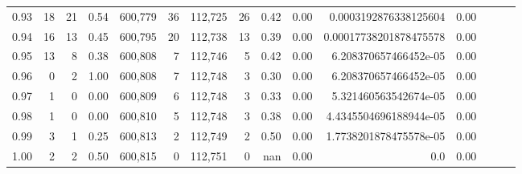 \begin{tabular}{rrrrrrrrrrrrrrr}
0.93 &      18 &     21 &  0.54 &  600,779 &       36 &  112,725 &       26 &  0.42 &  0.00 &   0.0003192876338125604 &      0.00 \\
0.94 &      16 &     13 &  0.45 &  600,795 &       20 &  112,738 &       13 &  0.39 &  0.00 &  0.00017738201878475578 &      0.00 \\
0.95 &      13 &      8 &  0.38 &  600,808 &        7 &  112,746 &        5 &  0.42 &  0.00 &   6.208370657466452e-05 &      0.00 \\
0.96 &       0 &      2 &  1.00 &  600,808 &        7 &  112,748 &        3 &  0.30 &  0.00 &   6.208370657466452e-05 &      0.00 \\
0.97 &       1 &      0 &  0.00 &  600,809 &        6 &  112,748 &        3 &  0.33 &  0.00 &   5.321460563542674e-05 &      0.00 \\
0.98 &       1 &      0 &  0.00 &  600,810 &        5 &  112,748 &        3 &  0.38 &  0.00 &  4.4345504696188944e-05 &      0.00 \\
0.99 &       3 &      1 &  0.25 &  600,813 &        2 &  112,749 &        2 &  0.50 &  0.00 &  1.7738201878475578e-05 &      0.00 \\
1.00 &       2 &      2 &  0.50 &  600,815 &        0 &  112,751 &        0 &   nan &  0.00 &                     0.0 &      0.00 \\
\bottomrule
\end{tabular}
